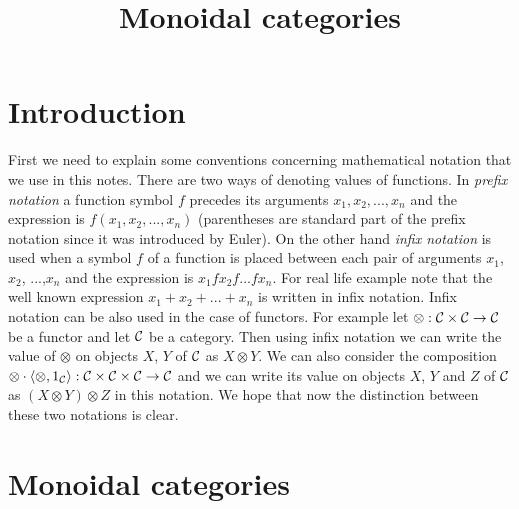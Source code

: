 



\title{Monoidal categories}
\date{}
\maketitle

\section{Introduction}
\noindent
First we need to explain some conventions concerning mathematical notation that we use in this notes. There are two ways of denoting values of functions. In \textit{prefix notation} a function symbol $f$ precedes its arguments $x_1,x_2,...,x_n$ and the expression is $f(x_1,x_2,...,x_n)$ (parentheses are standard part of the prefix notation since it was introduced by Euler). On the other hand \textit{infix notation} is used when a symbol $f$ of a function is placed between each pair of arguments $x_1$, $x_2$, ...,$x_n$ and the expression is $x_1 f x_2 f...fx_n$. For real life example note that the well known expression $x_1+x_2+...+x_n$ is written in infix notation. Infix notation can be also used in the case of functors. For example let $\otimes:{\mathcal C}\times {\mathcal C}\rightarrow {\mathcal C}$ be a functor and let ${\mathcal C}$ be a category. Then using infix notation we can write the value of $\otimes$ on objects $X$, $Y$ of ${\mathcal C}$ as $X\otimes Y$. We can also consider the composition $\otimes\cdot \langle \otimes, 1_{{\mathcal C}}\rangle:{\mathcal C}\times {\mathcal C}\times {\mathcal C}\rightarrow {\mathcal C}$ and we can write its value on objects $X$, $Y$ and $Z$ of ${\mathcal C}$ as $(X\otimes Y)\otimes Z$ in this notation. We hope that now the distinction between these two notations is clear.

\section{Monoidal categories}

